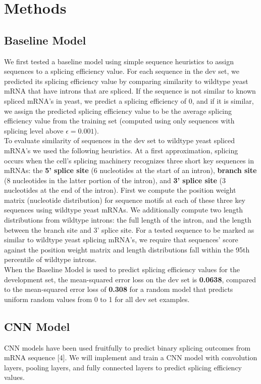 \documentclass[10.5pt]{article}
\begin{document}
\section{Methods}
\subsection{Baseline Model}
We first tested a baseline model using simple sequence heuristics to assign sequences to a splicing efficiency value. For each sequence in the dev set, we predicted its splicing efficiency value by comparing similarity to wildtype yeast mRNA that have introns that are spliced. If the sequence is not similar to known spliced mRNA's in yeast, we predict a splicing efficiency of 0, and if it is similar, we assign the predicted splicing efficiency value to be  the average splicing efficiency value from the training set (computed using only sequences with splicing level above $\epsilon = 0.001$). \newline \\
To evaluate similarity of sequences in the dev set to wildtype yeast spliced mRNA's we used the following heuristics. At a first approximation, splicing occurs when the cell's splicing machinery recognizes three short key sequences in mRNAs: the {\bf 5' splice site} (6 nucleotides at the start of an intron), {\bf branch site} (8 nucleotides in the latter portion of the intron), and {\bf 3' splice site} (3 nucleotides at the end of the intron). First we compute the position weight matrix (nucleotide distribution) for sequence motifs at each of these three key sequences using wildtype yeast mRNAs. We additionally compute two length distributions from wildtype introns: the full length of the intron, and the length between the branch site and 3' splice site. For a tested sequence to be marked as similar to wildtype yeast splicing mRNA's, we require that sequences' score against the position weight matrix and length distributions fall within the 95th percentile of wildtype introns. \newline \\
When the Baseline Model is used to predict splicing efficiency values for the development set, the mean-squared error loss on the dev set is {\bf 0.0638}, compared to the mean-squared error loss of {\bf 0.308} for a random model that predicts uniform random values from 0 to 1 for all dev set examples.
\subsection{CNN Model}
CNN models have been used fruitfully to predict binary splicing outcomes from mRNA sequence [4]. We will implement and train a CNN model with convolution layers, pooling layers, and fully connected layers to predict splicing efficiency values.
\end{document}
